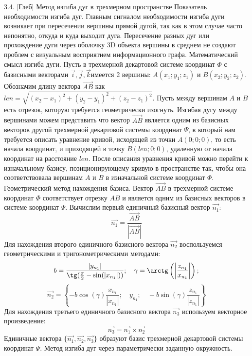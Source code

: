 3.4. [Глеб] Метод изгиба дуг в трехмерном пространстве
Показатель необходимости изгиба дуг.
Главным сигналом необходимости изгиба дуги возникает при пересечении вершины прямой дугой, так как в этом случае часто непонятно, откуда и куда выходит дуга. Пересечение разных дуг или прохождение дуги через оболочку 3D объекта вершины в среднем не создают проблем с визуальным восприятием информационного графа.
Математический смысл изгиба дуги.
Пусть в трехмерной декартовой системе координат $\Phi$ с базисными векторами $\overrightarrow{i}, \overrightarrow{j}, \overrightarrow{k}$имеется 2 вершины: $A(x_1; y_1; z_1)$ и $B(x_2; y_2; z_2)$. Обозначим длину вектора $\overrightarrow{AB}$ как $len = \sqrt{ (x_2 - x_1)^2 + (y_2 - y_1)^2 + (z_2 - z_1)^2 }$. Пусть между вершинам $A$ и $B$ есть отрезок, которую требуется геометрически изогнуть. Изгибая дугу между вершинами можем представить что вектор $\overrightarrow{AB}$ является одним из базисных векторов другой трехмерной декартовой системы координат $\Psi$, в который нам требуется описать уравнение кривой, исходящей из точки $A(0; 0; 0)$, то есть начала координат, и приходящей в точку $B\left(len; 0; 0 \right)$, удаленную от начала координат на расстояние $len$. После описания уравнения кривой можно перейти к изначальному базису, позиционирующему кривую в пространстве так, чтобы она соответствовала вершинам $A$ и $B$ в изначальной системе координат $\Phi$.
Геометрический метод нахождения базиса.
Вектор $\overrightarrow{AB}$ в трехмерной системе координат $\Phi$ соответствует отрезку $AB$ и является одним из базисных векторов в системе координат $\Psi$. Вычислим первый единичный базисный вектор $\overrightarrow{n_1}$:
$$ \overrightarrow{n_1} = \frac {\overrightarrow{AB}} {\left|\overrightarrow{AB}\right|} $$
Для нахождения второго единичного базисного вектора $\overrightarrow{n_2}$ воспользуемся геометрическими и тригонометрическими методами:
$$ b = \frac {\left|y_{n_1}\right|} {\tg( \frac{\pi}{2} -\sin(\left|x_{n_1}\right|) )}; \quad \gamma = \arctg\left( \left| \frac{z_{n_1}}{x_{n_1}} \right| \right); $$
$$ \overrightarrow{n_2} = \left\{ -b\cos(\gamma) \frac{x_{n_1}} {\left|x_{n_1}\right|}; \quad y_{n_1}; \quad -b\sin(\gamma) \frac{z_{n_1}} {\left|z_{n_1}\right|} \right\} $$
Для нахождения третьего единичного базисного вектора $\overrightarrow{n_3}$ используем векторное произведение:
$$ \overrightarrow{n_3} = \overrightarrow{n_1} \times \overrightarrow{n_2} $$
Единичные вектора $\{\overrightarrow{n_1}, \overrightarrow{n_2}, \overrightarrow{n_3}\}$ образуют базис трехмерной декартовой системы координат $\Psi$.
Метод изгиба дуг через параметрически заданную окружность.
